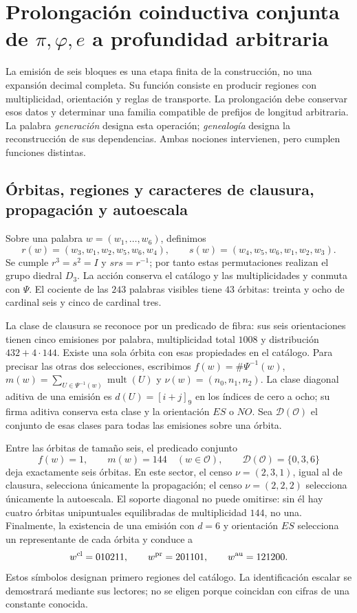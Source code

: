 \section{Prolongación coinductiva conjunta de \texorpdfstring{\(\pi,\varphi,e\)}{pi, phi, e} a profundidad arbitraria}
\label{sec:generacion}

La emisión de seis bloques es una etapa finita de la construcción, no una expansión decimal completa. Su función consiste en producir regiones con multiplicidad, orientación y reglas de transporte. La prolongación debe conservar esos datos y determinar una familia compatible de prefijos de longitud arbitraria. La palabra \emph{generación} designa esta operación; \emph{genealogía} designa la reconstrucción de sus dependencias. Ambas nociones intervienen, pero cumplen funciones distintas.

\subsection{Órbitas, regiones y caracteres de clausura, propagación y autoescala}

Sobre una palabra \(w=(w_1,\ldots,w_6)\), definimos
\[
 r(w)=(w_3,w_1,w_2,w_5,w_6,w_4),\qquad
 s(w)=(w_4,w_5,w_6,w_1,w_2,w_3).
\]
Se cumple \(r^3=s^2=I\) y \(srs=r^{-1}\); por tanto estas permutaciones realizan el grupo diedral \(D_3\). La acción conserva el catálogo y las multiplicidades y conmuta con \(\Psi\). El cociente de las \(243\) palabras visibles tiene \(43\) órbitas: treinta y ocho de cardinal seis y cinco de cardinal tres.

La clase de clausura se reconoce por un predicado de fibra: sus seis orientaciones tienen cinco emisiones por palabra, multiplicidad total \(1008\) y distribución \(432+4\cdot144\). Existe una sola órbita con esas propiedades en el catálogo. Para precisar las otras dos selecciones, escribimos \(f(w)=\#\Psi^{-1}(w)\), \(m(w)=\sum_{U\in\Psi^{-1}(w)}\operatorname{mult}(U)\) y \(\nu(w)=(n_0,n_1,n_2)\). La clase diagonal aditiva de una emisión es \(d(U)=[i+j]_9\) en los índices de cero a ocho; su firma aditiva conserva esta clase y la orientación \(ES\) o \(NO\). Sea \(\mathcal D(\mathcal O)\) el conjunto de esas clases para todas las emisiones sobre una órbita.

Entre las órbitas de tamaño seis, el predicado conjunto
\[
 f(w)=1,\qquad m(w)=144\quad(w\in\mathcal O),\qquad
 \mathcal D(\mathcal O)=\{0,3,6\}
\]
deja exactamente seis órbitas. En este sector, el censo \(\nu=(2,3,1)\), igual al de clausura, selecciona únicamente la propagación; el censo \(\nu=(2,2,2)\) selecciona únicamente la autoescala. El soporte diagonal no puede omitirse: sin él hay cuatro órbitas unipuntuales equilibradas de multiplicidad \(144\), no una. Finalmente, la existencia de una emisión con \(d=6\) y orientación \(ES\) selecciona un representante de cada órbita y conduce a
\begin{equation}
 w^{\rm cl}=010211,\qquad w^{\rm pr}=201101,\qquad w^{\rm au}=121200.
 \label{eq:palabras-regionales}
\end{equation}
Estos símbolos designan primero regiones del catálogo. La identificación escalar se demostrará mediante sus lectores; no se eligen porque coincidan con cifras de una constante conocida.

